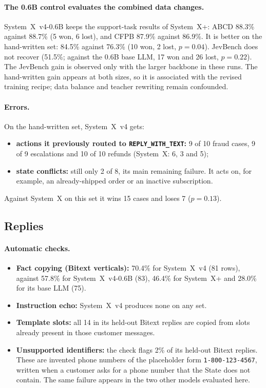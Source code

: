 \documentclass[11pt]{article}
\newcommand{\reply}{\texttt{REPLY\_WITH\_TEXT}}
\newcommand{\sysplus}{System~X+}
\newcommand{\sysfour}{System~X~v4}
\newcommand{\sysfoursmall}{System~X~v4-0.6B}
\begin{document}
\paragraph{The 0.6B control evaluates the combined data changes.} \sysfoursmall{} keeps the support-task results of \sysplus{}: ABCD 88.3\% against 88.7\% (5 won, 6 lost), and CFPB 87.9\% against 86.9\%. It is better on the hand-written set: 84.5\% against 76.3\% (10 won, 2 lost, $p=0.04$). JevBench does not recover (51.5\%; against the 0.6B base LLM, 17 won and 26 lost, $p=0.22$). The JevBench gain is observed only with the larger backbone in these runs. The hand-written gain appears at both sizes, so it is associated with the revised training recipe; data balance and teacher rewriting remain confounded.

\paragraph{Errors.} On the hand-written set, \sysfour{} gets:
\begin{itemize}
\item \textbf{actions it previously routed to \reply{}:} 9 of 10 fraud cases, 9 of 9 escalations and 10 of 10 refunds (System~X: 6, 3 and 5);
\item \textbf{state conflicts:} still only 2 of 8, its main remaining failure. It acts on, for example, an already-shipped order or an inactive subscription.
\end{itemize}
Against System~X on this set it wins 15 cases and loses 7 ($p=0.13$).

\subsection{Replies}

\paragraph{Automatic checks.}
\begin{itemize}
\item \textbf{Fact copying (Bitext verticals):} 70.4\% for \sysfour{} (81 rows), against 57.8\% for \sysfoursmall{} (83), 46.4\% for \sysplus{} and 28.0\% for its base LLM (75).
\item \textbf{Instruction echo:} \sysfour{} produces none on any set.
\item \textbf{Template slots:} all 14 in its held-out Bitext replies are copied from slots already present in those customer messages.
\item \textbf{Unsupported identifiers:} the check flags 2\% of its held-out Bitext replies. These are invented phone numbers of the placeholder form \texttt{1-800-123-4567}, written when a customer asks for a phone number that the State does not contain. The same failure appears in the two other models evaluated here.
\end{itemize}
\end{document}

